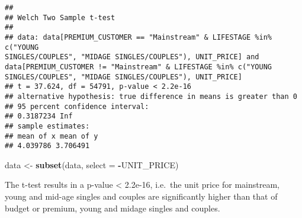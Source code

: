 \documentclass[]{article}
\newenvironment{Shaded}{\begin{snugshade}}{\end{snugshade}}
\newcommand{\CommentTok}[1]{\textcolor[rgb]{0.56,0.35,0.01}{\textit{#1}}}
\newcommand{\DataTypeTok}[1]{\textcolor[rgb]{0.13,0.29,0.53}{#1}}
\newcommand{\ErrorTok}[1]{\textcolor[rgb]{0.64,0.00,0.00}{\textbf{#1}}}
\newcommand{\KeywordTok}[1]{\textcolor[rgb]{0.13,0.29,0.53}{\textbf{#1}}}
\newcommand{\NormalTok}[1]{#1}
\newcommand{\OperatorTok}[1]{\textcolor[rgb]{0.81,0.36,0.00}{\textbf{#1}}}
\newcommand{\StringTok}[1]{\textcolor[rgb]{0.31,0.60,0.02}{#1}}
\begin{document}
\begin{Shaded}
\end{Shaded}

\begin{verbatim}
##
## Welch Two Sample t-test
##
## data: data[PREMIUM_CUSTOMER == "Mainstream" & LIFESTAGE %in% c("YOUNG
SINGLES/COUPLES", "MIDAGE SINGLES/COUPLES"), UNIT_PRICE] and
data[PREMIUM_CUSTOMER != "Mainstream" & LIFESTAGE %in% c("YOUNG
SINGLES/COUPLES", "MIDAGE SINGLES/COUPLES"), UNIT_PRICE]
## t = 37.624, df = 54791, p-value < 2.2e-16
## alternative hypothesis: true difference in means is greater than 0
## 95 percent confidence interval:
## 0.3187234 Inf
## sample estimates:
## mean of x mean of y
## 4.039786 3.706491
\end{verbatim}

\begin{Shaded}
\begin{Highlighting}[]
\NormalTok{data <-}\StringTok{ }\KeywordTok{subset}\NormalTok{(data, }\DataTypeTok{select =} \OperatorTok{-}\NormalTok{UNIT_PRICE)}
\end{Highlighting}
\end{Shaded}

The t-test results in a p-value \textless{} 2.2e-16, i.e.~the unit price
for mainstream, young and mid-age singles and couples are significantly
higher than that of budget or premium, young and midage singles and
couples.
\end{document}
